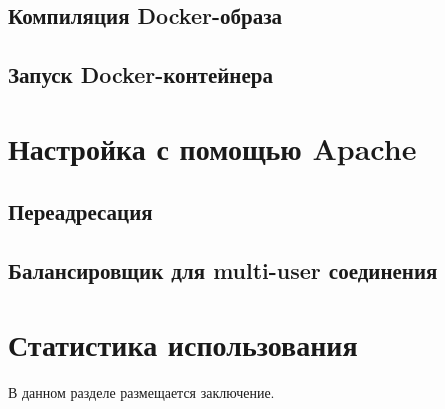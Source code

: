 \documentclass[specification,annotation]{itmo-student-thesis}
\begin{document}
\subsection{Компиляция Docker-образа}
\subsection{Запуск Docker-контейнера}

\section{Настройка с помощью Apache}
\subsection{Переадресация}
\subsection{Балансировщик для multi-user соединения}

\section{Статистика использования}

\chapterconclusion

\startconclusionpage

В данном разделе размещается заключение.

\printmainbibliography

\appendix
\end{document}
